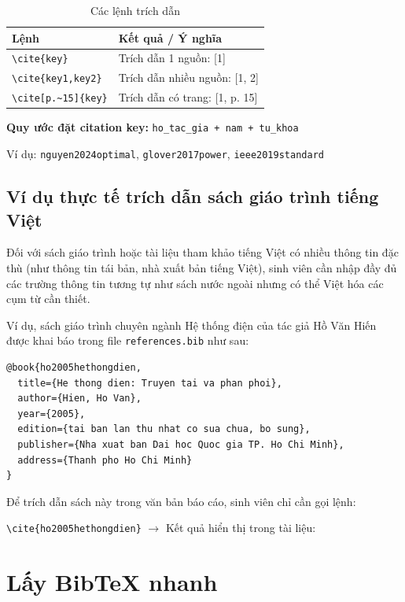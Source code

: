 \begin{table}[H]
\centering
\caption{Các lệnh trích dẫn}
\label{tab:cite-commands}
\begin{tabular}{lp{9cm}}
\toprule
\textbf{Lệnh} & \textbf{Kết quả / Ý nghĩa} \\
\midrule
\verb|\cite{key}|          & Trích dẫn 1 nguồn: [1] \\
\verb|\cite{key1,key2}|    & Trích dẫn nhiều nguồn: [1, 2] \\
\verb|\cite[p.~15]{key}|   & Trích dẫn có trang: [1, p. 15] \\
\bottomrule
\end{tabular}
\end{table}

\textbf{Quy ước đặt citation key:} \texttt{ho\_tac\_gia + nam + tu\_khoa}

Ví dụ: \texttt{nguyen2024optimal}, \texttt{glover2017power}, \texttt{ieee2019standard}

\subsection{Ví dụ thực tế trích dẫn sách giáo trình tiếng Việt}
Đối với sách giáo trình hoặc tài liệu tham khảo tiếng Việt có nhiều thông tin đặc thù (như thông tin tái bản, nhà xuất bản tiếng Việt), sinh viên cần nhập đầy đủ các trường thông tin tương tự như sách nước ngoài nhưng có thể Việt hóa các cụm từ cần thiết.

Ví dụ, sách giáo trình chuyên ngành Hệ thống điện của tác giả Hồ Văn Hiến~\cite{ho2005hethongdien} được khai báo trong file \texttt{references.bib} như sau:
\begin{lstlisting}[style=latexstyle, caption={Khai báo sách tiếng Việt mẫu trong .bib}]
@book{ho2005hethongdien,
  title={He thong dien: Truyen tai va phan phoi},
  author={Hien, Ho Van},
  year={2005},
  edition={tai ban lan thu nhat co sua chua, bo sung},
  publisher={Nha xuat ban Dai hoc Quoc gia TP. Ho Chi Minh},
  address={Thanh pho Ho Chi Minh}
}
\end{lstlisting}

Để trích dẫn sách này trong văn bản báo cáo, sinh viên chỉ cần gọi lệnh:
\begin{center}
  \texttt{\textbackslash cite\{ho2005hethongdien\}} $\rightarrow$ Kết quả hiển thị trong tài liệu: \cite{ho2005hethongdien}
\end{center}

\section{Lấy BibTeX nhanh}

